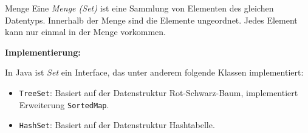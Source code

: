 \begin{defi}{Menge}
    Eine \emph{Menge (Set)} ist eine Sammlung von Elementen des gleichen Datentyps.
    Innerhalb der Menge sind die Elemente ungeordnet.
    Jedes Element kann nur einmal in der Menge vorkommen.

    \textbf{Implementierung:}

    In Java ist \emph{Set} ein Interface, das unter anderem folgende Klassen implementiert:
    \begin{itemize}
        \item \texttt{TreeSet}: Basiert auf der Datenstruktur Rot-Schwarz-Baum, implementiert Erweiterung \texttt{SortedMap}.
        \item \texttt{HashSet}: Basiert auf der Datenstruktur Hashtabelle.
    \end{itemize}
\end{defi}

